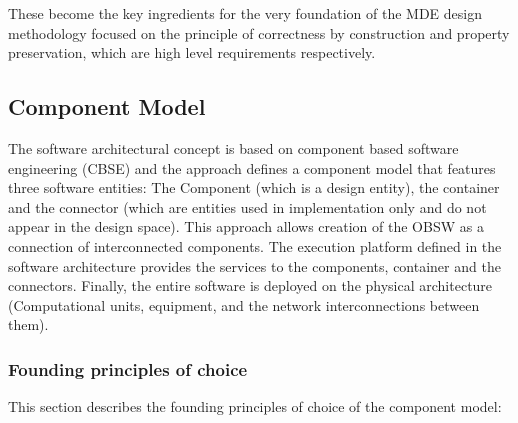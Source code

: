 These become the key ingredients for the very foundation of the MDE design methodology focused on the principle of correctness by construction and property preservation, which are high level requirements respectively.

\subsection{Component Model}
The software architectural concept is based on component based software engineering (CBSE) and the approach defines a component model that features three software entities: The Component (which is a design entity), the container and the connector (which are entities used in implementation only and do not appear in the design space). This approach allows creation of the OBSW as a connection of interconnected components. The execution platform defined in the software architecture provides the services to the components, container and the connectors. Finally, the entire software is deployed on the physical architecture (Computational units, equipment, and the network interconnections between them).

\subsubsection{Founding principles of choice}
This section describes the founding principles of choice of the component model:

